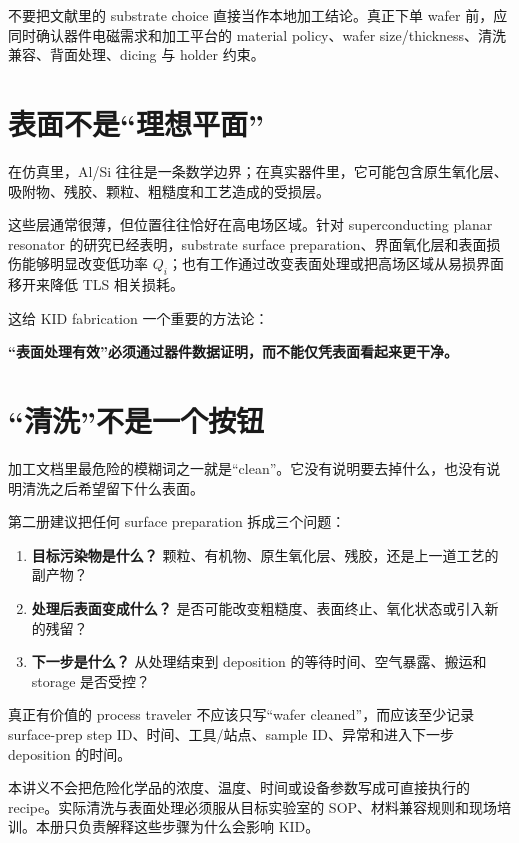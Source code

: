 \begin{warningbox}
不要把文献里的 substrate choice 直接当作本地加工结论。真正下单 wafer 前，应同时确认器件电磁需求和加工平台的 material policy、wafer size/thickness、清洗兼容、背面处理、dicing 与 holder 约束。
\end{warningbox}

\section{表面不是“理想平面”}

在仿真里，Al/Si 往往是一条数学边界；在真实器件里，它可能包含原生氧化层、吸附物、残胶、颗粒、粗糙度和工艺造成的受损层。

这些层通常很薄，但位置往往恰好在高电场区域。针对 superconducting planar resonator 的研究已经表明，substrate surface preparation、界面氧化层和表面损伤能够明显改变低功率 $Q_i$；也有工作通过改变表面处理或把高场区域从易损界面移开来降低 TLS 相关损耗。

这给 KID fabrication 一个重要的方法论：

\begin{center}
\textbf{“表面处理有效”必须通过器件数据证明，而不能仅凭表面看起来更干净。}
\end{center}

\section{“清洗”不是一个按钮}

加工文档里最危险的模糊词之一就是“clean”。它没有说明要去掉什么，也没有说明清洗之后希望留下什么表面。

第二册建议把任何 surface preparation 拆成三个问题：

\begin{enumerate}
  \item \textbf{目标污染物是什么？} 颗粒、有机物、原生氧化层、残胶，还是上一道工艺的副产物？
  \item \textbf{处理后表面变成什么？} 是否可能改变粗糙度、表面终止、氧化状态或引入新的残留？
  \item \textbf{下一步是什么？} 从处理结束到 deposition 的等待时间、空气暴露、搬运和 storage 是否受控？
\end{enumerate}

真正有价值的 process traveler 不应该只写“wafer cleaned”，而应该至少记录 surface-prep step ID、时间、工具/站点、sample ID、异常和进入下一步 deposition 的时间。

\begin{warningbox}
本讲义不会把危险化学品的浓度、温度、时间或设备参数写成可直接执行的 recipe。实际清洗与表面处理必须服从目标实验室的 SOP、材料兼容规则和现场培训。本册只负责解释这些步骤为什么会影响 KID。
\end{warningbox}

